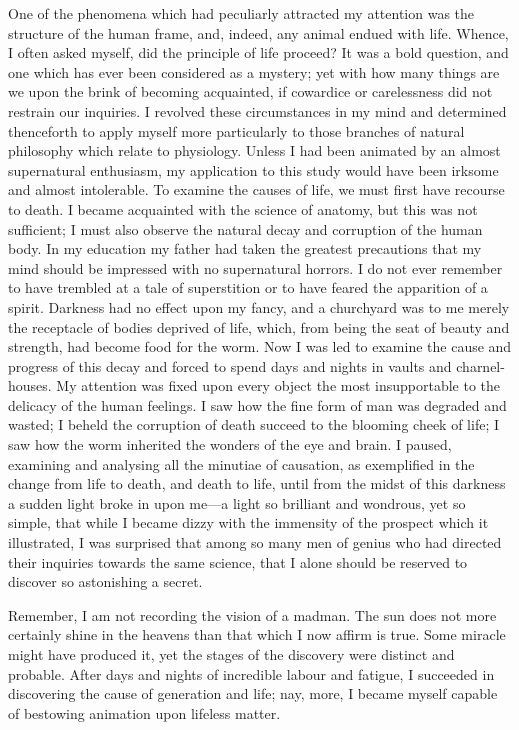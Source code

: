 \documentclass[12pt,openright]{book}
\begin{document}
One of the phenomena which had peculiarly attracted my attention was the structure of the human frame, and, indeed, any animal endued with life. Whence, I often asked myself, did the principle of life proceed? It was a bold question, and one which has ever been considered as a mystery; yet with how many things are we upon the brink of becoming acquainted, if cowardice or carelessness did not restrain our inquiries. I revolved these circumstances in my mind and determined thenceforth to apply myself more particularly to those branches of natural philosophy which relate to physiology. Unless I had been animated by an almost supernatural enthusiasm, my application to this study would have been irksome and almost intolerable. To examine the causes of life, we must first have recourse to death. I became acquainted with the science of anatomy, but this was not sufficient; I must also observe the natural decay and corruption of the human body. In my education my father had taken the greatest precautions that my mind should be impressed with no supernatural horrors. I do not ever remember to have trembled at a tale of superstition or to have feared the apparition of a spirit. Darkness had no effect upon my fancy, and a churchyard was to me merely the receptacle of bodies deprived of life, which, from being the seat of beauty and strength, had become food for the worm. Now I was led to examine the cause and progress of this decay and forced to spend days and nights in vaults and charnel-houses. My attention was fixed upon every object the most insupportable to the delicacy of the human feelings. I saw how the fine form of man was degraded and wasted; I beheld the corruption of death succeed to the blooming cheek of life; I saw how the worm inherited the wonders of the eye and brain. I paused, examining and analysing all the minutiae of causation, as exemplified in the change from life to death, and death to life, until from the midst of this darkness a sudden light broke in upon me—a light so brilliant and wondrous, yet so simple, that while I became dizzy with the immensity of the prospect which it illustrated, I was surprised that among so many men of genius who had directed their inquiries towards the same science, that I alone should be reserved to discover so astonishing a secret.

Remember, I am not recording the vision of a madman. The sun does not more certainly shine in the heavens than that which I now affirm is true. Some miracle might have produced it, yet the stages of the discovery were distinct and probable. After days and nights of incredible labour and fatigue, I succeeded in discovering the cause of generation and life; nay, more, I became myself capable of bestowing animation upon lifeless matter.
\end{document}
